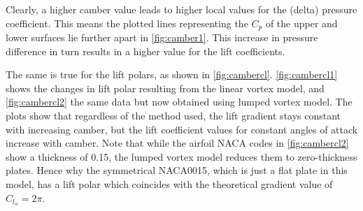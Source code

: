 Clearly, a higher camber value leads to higher local values for the (delta) pressure
coefficient. This means the plotted lines representing the $C_p$ of the upper
and lower surfaces lie further apart in \cref{fig:camber1}. This increase in pressure difference in
turn results in a higher value for the lift coefficients.
\medskip

The same is true for the lift polars, as shown in \autoref{fig:cambercl}.
\autoref{fig:cambercl1} shows the changes in lift polar resulting from the
linear vortex model, and \autoref{fig:cambercl2} the same data but now obtained
using lumped vortex model. The plots show that regardless of the method used,
the lift gradient stays constant with increasing camber, but the lift
coefficient values for constant angles of attack increase with camber. Note that
while the airfoil NACA codes in \cref{fig:cambercl2} show a thickness of 0.15,
the lumped vortex model reduces them to zero-thickness plates. Hence why the
symmetrical NACA0015, which is just a flat plate in this model, has a lift
polar which coincides with the theoretical gradient value of $C_{l_\alpha} = 2\pi$.

